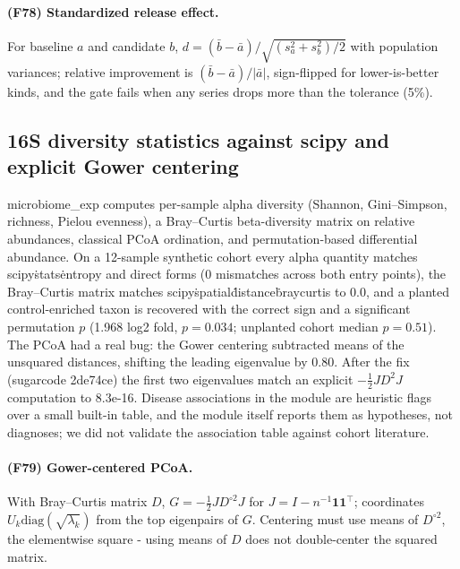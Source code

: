 \paragraph{(F78) Standardized release effect.} For baseline $a$ and candidate $b$, $d=(\bar b-\bar a)/\sqrt{(s_a^2+s_b^2)/2}$ with population variances; relative improvement is $(\bar b-\bar a)/|\bar a|$, sign-flipped for lower-is-better kinds, and the gate fails when any series drops more than the tolerance (5\%).
\subsection{16S diversity statistics against scipy and explicit Gower centering}
microbiome\_exp computes per-sample alpha diversity (Shannon, Gini--Simpson, richness, Pielou evenness), a Bray--Curtis beta-diversity matrix on relative abundances, classical PCoA ordination, and permutation-based differential abundance. On a 12-sample synthetic cohort every alpha quantity matches scipy\.stats\.entropy and direct forms (0 mismatches across both entry points), the Bray--Curtis matrix matches scipy\.spatial\.distance\.braycurtis to 0.0, and a planted control-enriched taxon is recovered with the correct sign and a significant permutation $p$ (1.968 log2 fold, $p=0.034$; unplanted cohort median $p=0.51$). The PCoA had a real bug: the Gower centering subtracted means of the unsquared distances, shifting the leading eigenvalue by 0.80. After the fix (sugarcode 2de74ce) the first two eigenvalues match an explicit $-\tfrac12 J D^2 J$ computation to 8.3e-16. Disease associations in the module are heuristic flags over a small built-in table, and the module itself reports them as hypotheses, not diagnoses; we did not validate the association table against cohort literature.
\paragraph{(F79) Gower-centered PCoA.} With Bray--Curtis matrix $D$, $G=-\tfrac12 J D^{\circ 2} J$ for $J=I-n^{-1}\mathbf 1\mathbf 1^{\top}$; coordinates $U_k\mathrm{diag}(\sqrt{\lambda_k})$ from the top eigenpairs of $G$. Centering must use means of $D^{\circ 2}$, the elementwise square - using means of $D$ does not double-center the squared matrix.
